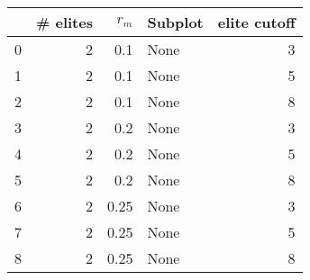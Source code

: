 \begin{tabular}{lrrlr}
\hline
{} &                                 # elites &                                    $r_m$ &                                  Subplot &                             elite cutoff \\
\midrule
0                                        &                                        2 &                                      0.1 &                                     None &                                        3 \\
1                                        &                                        2 &                                      0.1 &                                     None &                                        5 \\
2                                        &                                        2 &                                      0.1 &                                     None &                                        8 \\
3                                        &                                        2 &                                      0.2 &                                     None &                                        3 \\
4                                        &                                        2 &                                      0.2 &                                     None &                                        5 \\
5                                        &                                        2 &                                      0.2 &                                     None &                                        8 \\
6                                        &                                        2 &                                     0.25 &                                     None &                                        3 \\
7                                        &                                        2 &                                     0.25 &                                     None &                                        5 \\
8                                        &                                        2 &                                     0.25 &                                     None &                                        8 \\
\hline
\end{tabular}
